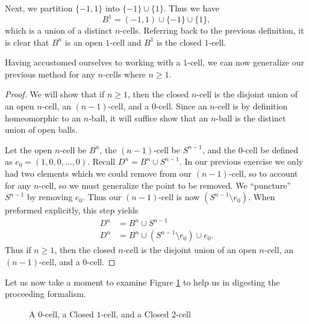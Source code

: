 \documentclass[12pt,oneside]{amsbook}
\newcommand{\n}{$n$}
\begin{document}
Next, we partition $\{-1,1\}$ into $\{-1\}\cup\{1\}$. Thus we have $$B^1 = (-1,1) \cup \{-1\}\cup\{1\},$$ which is a union of a distinct $n$-cells. Referring back to the previous definition, it is clear that $B^n$ is an open $1$-cell and $B^1$ is the closed $1$-cell.

Having accustomed ourselves to working with a $1$-cell, we can now generalize our previous method for any $n$-cells where $n\geq 1$.

\begin{proof}
We will show that if $n\geq1$, then the closed \n-cell is the disjoint union of an open \n-cell, an $(n-1)$-cell, and a $0$-cell. Since an \n-cell is by definition homeomorphic to an \n-ball, it will suffice show that an \n-ball is the distinct union of open balls.

Let the open \n-cell be $B^n$, the $(n-1)$-cell be $S^{n-1}$, and the $0$-cell be defined as $e_0=(1,0,0,\dots, 0)$. Recall $D^n= B^n \cup S^{n-1}$.  In our previous exercise we only had two elements which we could remove from our $(n-1)$-cell, so to account for any \n-cell, so we must generalize the point to be removed. We ``puncture'' \cite{cw} $S^{n-1}$ by removing $e_0$. Thus our $(n-1)$-cell is now $(S^{n-1}\setminus e_0)$. When preformed explicitly, this step yields
\begin{align*}
D^n&= B^n \cup S^{n-1}\\
D^n&= B^n \cup (S^{n-1}\setminus e_0) \cup e_0.
\end{align*}
Thus if $n\geq1$, then the closed \n-cell is the disjoint union of an open \n-cell, an $(n-1)$-cell, and a $0$-cell.
\end{proof}
\vspace{7mm}
Let us now take a moment to examine Figure \ref{fig:ncells} to help us in digesting the proceeding formalism.

\begin{figure}[h]
\label{fig:ncells}
\centering
\caption{A $0$-cell, a Closed $1$-cell, and a Closed $2$-cell}
\hspace{.5in}
\hspace{.5in}
\end{figure}
\end{document}
